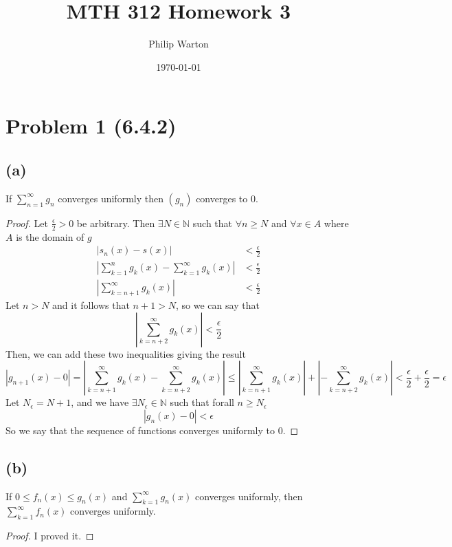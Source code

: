 \documentclass{article}
\begin{document}
\title{MTH 312 Homework 3}
\author{Philip Warton}
\date{\today}
\maketitle

\section*{Problem 1 (6.4.2)}
\subsection*{(a)}
If $\sum_{n=1}^\infty g_n$ converges uniformly then $(g_n)$ converges to 0.
\begin{proof}
    Let $\frac{\epsilon}{2} > 0$ be arbitrary.
    Then $\exists N \in \mathbb{N}$ such that $\forall n \geqslant N$ and $\forall x \in A$ where $A$ is the domain of $g$
    \begin{align*}
        |s_n(x) - s(x)| & < \frac{\epsilon}{2} \\
        \left| \sum_{k=1}^n g_k(x) - \sum_{k=1}^\infty g_k(x)\right| & < \frac{\epsilon}{2} \\
        \left| \sum_{k=n+1}^\infty g_k(x) \right| & < \frac{\epsilon}{2}
    \end{align*}
    Let $n > N$ and it follows that $n + 1 > N$, so we can say that
    \[
        \left|\sum_{k=n+2}^\infty g_k(x)\right| < \frac{\epsilon}{2}
    \]
    Then, we can add these two inequalities giving the result
    \[
        |g_{n+1}(x) - 0| = \left|\sum_{k = n+1}^\infty g_k(x) - \sum_{k=n+2}^\infty g_k(x)\right| \leqslant \left| \sum_{k=n+1}^\infty g_k(x)\right| + \left|-\sum_{k=n+2}^\infty g_k(x)\right| < \frac{\epsilon}{2} + \frac{\epsilon}{2} = \epsilon
    \]
    Let $N_\epsilon = N + 1$, and we have $\exists N_\epsilon \in \mathbb{N}$ such that forall $n \geqslant N_\epsilon$
    \[|g_n(x) - 0 | < \epsilon\]
    So we say that the sequence of functions converges uniformly to 0.
\end{proof}

\subsection*{(b)}
If $0 \leqslant f_n(x) \leqslant g_n(x)$ and $\sum_{k=1}^\infty g_n(x)$ converges uniformly, then $\sum_{k=1}^\infty f_n(x)$ converges uniformly.
\begin{proof}
    I proved it.
\end{proof}
\end{document}
